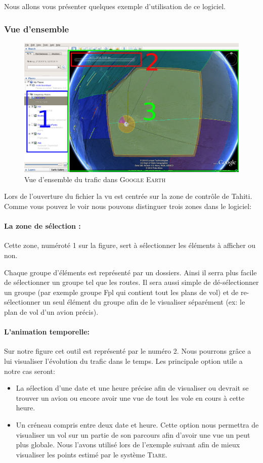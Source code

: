 Nous allons vous présenter quelques exemple d'utilisation de ce logiciel.

        \subsubsection{Vue d'ensemble}
\begin{figure}[!h]
\center
\includegraphics[width=12cm]{images/gevuedensemble.png}
\caption{Vue d’ensemble du trafic dans \textsc{Google Earth}}
\label{gevuedensemble}
\end{figure}
Lors de l'ouverture du fichier la vu est centrée sur la zone de contrôle de Tahiti. Comme vous pouvez le voir  nous pouvons distinguer trois zones dans le logiciel:
            \paragraph{La zone de sélection :}
Cette zone, numéroté 1 sur la figure, sert à sélectionner les éléments à afficher ou non. 

Chaque groupe d'éléments est représenté par un dossiers. Ainsi il serra plus facile de sélectionner un groupe tel que les routes. Il sera aussi simple de dé-sélectionner un groupe (par exemple groupe Fpl qui contient tout les plans de vol) et de re-sélectionner un seul élément du groupe afin de le visualiser séparément (ex: le plan de vol d'un avion précis).

            \paragraph{L'animation temporelle:}
Sur notre figure cet outil est représenté par le numéro 2. Nous pourrons grâce a lui visualiser l'évolution du trafic dans le temps. Les principale option utile a notre cas seront:
\begin{itemize}
\item La sélection d'une date et une heure précise afin de visualiser ou devrait se trouver un avion ou encore avoir une vue de tout les vole en cours à cette heure.
\item Un créneau compris entre deux date et heure. Cette option nous permettra de visualiser un vol sur un partie de son parcours afin d'avoir une vue un peut plus globale. Nous l'avons utilisé lors de l'exemple suivant  afin de mieux visualiser les points estimé par le système \textsc{Tiare}.
\end{itemize}

